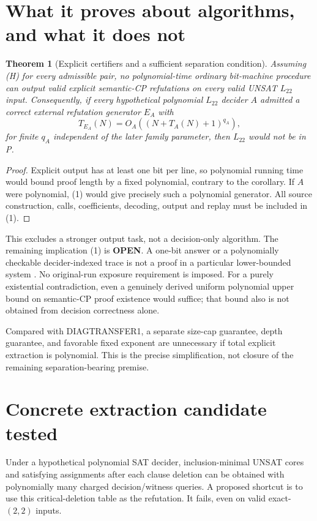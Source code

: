 \documentclass[11pt]{article}
\newtheorem{theorem}{Theorem}
\begin{document}
\section{What it proves about algorithms, and what it does not}
\begin{theorem}[Explicit certifiers and a sufficient separation condition]
Assuming (H) for every admissible pair, no polynomial-time ordinary bit-machine
procedure can output valid explicit semantic-CP refutations on every valid
UNSAT $L_{22}$ input. Consequently, if every hypothetical polynomial $L_{22}$
decider $A$ admitted a correct external refutation generator $E_A$ with
\[
 T_{E_A}(N)=O_A((N+T_A(N)+1)^{q_A}),                         \tag{1}
\]
for finite $q_A$ independent of the later family parameter, then $L_{22}$
would not be in P.
\end{theorem}
\begin{proof}
Explicit output has at least one bit per line, so polynomial running time
would bound proof length by a fixed polynomial, contrary to the corollary.
If $A$ were polynomial, (1) would give precisely such a polynomial generator.
All source construction, calls, coefficients, decoding, output and replay
must be included in (1).
\end{proof}
This excludes a stronger output task, not a decision-only algorithm. The
remaining implication (1) is \textbf{OPEN}. A one-bit answer or a
polynomially checkable decider-indexed trace is not a proof in a particular
lower-bounded system \cite{cr}. No original-run exposure requirement is
imposed. For a purely existential contradiction, even a genuinely derived
uniform polynomial upper bound on semantic-CP proof existence would suffice;
that bound also is not obtained from decision correctness alone.

Compared with DIAGTRANSFER1, a separate size-cap guarantee, depth guarantee,
and favorable fixed exponent are unnecessary if total explicit extraction
is polynomial. This is the precise simplification, not closure of the
remaining separation-bearing premise.

\section{Concrete extraction candidate tested}
Under a hypothetical polynomial SAT decider, inclusion-minimal UNSAT cores
and satisfying assignments after each clause deletion can be obtained with
polynomially many charged decision/witness queries. A proposed shortcut is
to use this critical-deletion table as the refutation. It fails, even on
valid exact-$(2,2)$ inputs.
\end{document}
